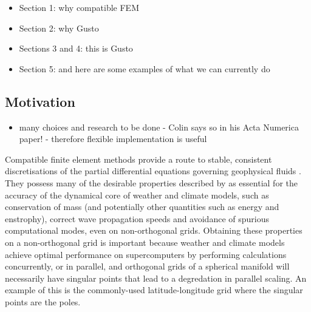 \documentclass[journal abbreviation, manuscript]{copernicus}
\begin{document}
\begin{itemize}
\item Section 1: why compatible FEM
\item Section 2: why Gusto
\item Sections 3 and 4: this is Gusto
\item Section 5: and here are some examples of what we can currently do
\end{itemize}

\introduction   %

\subsection{Motivation}
\begin{itemize}
\item many choices and research to be done - Colin says so in his Acta Numerica paper! - therefore flexible implementation is useful
\end{itemize}

Compatible finite element methods provide a route to stable,
consistent discretisations of the partial differential equations
governing geophysical fluids \citep{cotter2023compatible}. They
possess many of the desirable properties described by
\citet{staniforth2012horizontal} as essential for the accuracy of the
dynamical core of weather and climate models, such as conservation of
mass (and potentially other quantities such as energy and enstrophy),
correct wave propagation speeds and avoidance of spurious
computational modes, even on non-orthogonal grids. Obtaining these
properties on a non-orthogonal grid is important because weather and
climate models achieve optimal performance on supercomputers by
performing calculations concurrently, or in parallel, and orthogonal
grids of a spherical manifold will necessarily have singular points
that lead to a degredation in parallel scaling. An example of this is
the commonly-used latitude-longitude grid where the singular points
are the poles.

\end{document}
